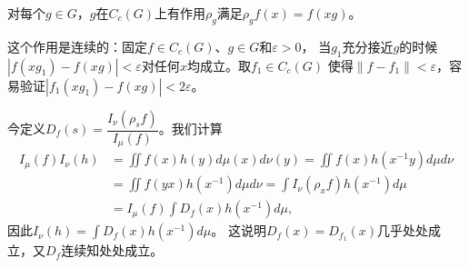 对每个$g \in G$，$g$在$C_c(G)$上有作用$\rho_g$满足$\rho_gf(x) = f(xg)$。

这个作用是连续的：固定$f \in C_c(G)$、$g \in G$和$\varepsilon > 0$，
当$g_1$充分接近$g$的时候$|f(xg_1) - f(xg)| < \varepsilon$对任何$x$均成立。取$f_1 \in C_c(G)$
使得$\|f - f_1\| < \varepsilon$，容易验证$|f_1(xg_1) - f(xg)| < 2\varepsilon$。

今定义$D_f(s) = \dfrac{I_\nu(\rho_sf)}{I_\mu(f)}$。我们计算
\begin{align*}
    I_\mu(f)I_\nu(h) & = \iint f(x)h(y)d\mu(x)d\nu(y) = \iint f(x)h(x^{-1}y)d\mu d\nu \\ 
    & = \iint f(yx)h(x^{-1})d\mu d\nu = \int I_\nu(\rho_xf)h(x^{-1})d\mu\\ 
    & = I_\mu(f) \int D_f(x)h(x^{-1})d\mu,
\end{align*}
因此$\displaystyle I_\nu(h) = \int D_f(x)h(x^{-1}) d\mu$。
这说明$D_f(x) = D_{f_1}(x)$几乎处处成立，又$D_f$连续知处处成立。


